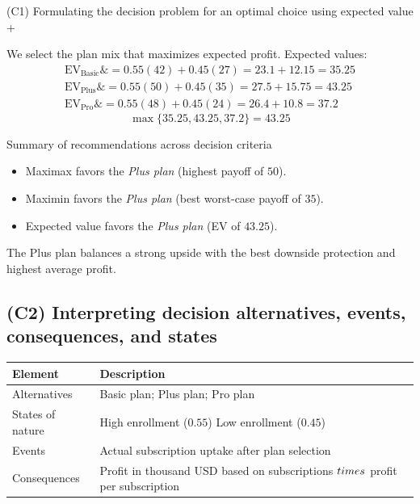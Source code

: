 \documentclass[11pt]{article}
\begin{document}
	
	
	
	
	(C1) Formulating the decision problem for an optimal choice using expected value
	+
	
	
	We select the plan mix that maximizes expected profit. Expected values:
	\[
	\begin{aligned}
		\mathrm{EV}_{\text{Basic}} \&= 0.55(42) + 0.45(27) = 23.1 + 12.15 = 35.25 \\
		\mathrm{EV}_{\text{Plus}} \&= 0.55(50) + 0.45(35) = 27.5 + 15.75 = 43.25 \\
		\mathrm{EV}_{\text{Pro}} \&= 0.55(48) + 0.45(24) = 26.4 + 10.8 = 37.2
	\end{aligned}
	\]
	\[
	\max\{35.25, 43.25, 37.2\} = 43.25
	\]
	
	Summary of recommendations across decision criteria
	\begin{itemize}
		\item Maximax favors the \emph{Plus plan} (highest payoff of $50$).
		\item Maximin favors the \emph{Plus plan} (best worst-case payoff of $35$).
		\item Expected value favors the \emph{Plus plan} (EV of $43.25$).
	\end{itemize}
	
	
	The Plus plan balances a strong upside with the best downside protection and highest average profit.
	
	\subsection*{(C2) Interpreting decision alternatives, events, consequences, and states}
	
	\hypertarget{problem5-c2}{}
	
	\begin{center}
		\begin{tabular}{ll}
			\toprule
			Element & Description \\
			\midrule
			Alternatives & Basic plan; Plus plan; Pro plan \\
			States of nature & High enrollment
			($0.55$)
			Low enrollment
			($0.45$) \\
			Events & Actual subscription uptake after plan selection \\
			Consequences & Profit in thousand USD based on subscriptions $\\times$ profit per subscription \\
			\bottomrule
		\end{tabular}
	\end{center}
	
\end{document}

